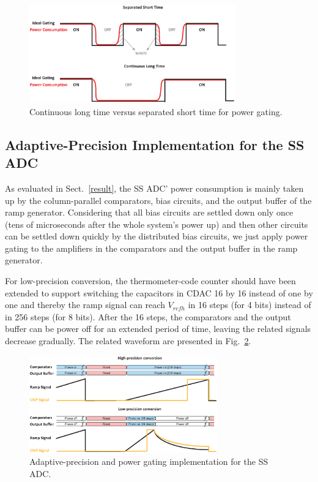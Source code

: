 \begin{figure}[htbp]
	\centerline{\includegraphics[width=3.5in]{./Figures/TIME.eps}}
	\caption{Continuous long time versus separated short time for power gating.}
	\label{TIME}
\end{figure}  

\subsection{Adaptive-Precision Implementation for the SS ADC}

As evaluated in Sect.~\ref{result}, the SS ADC’ power consumption is mainly taken up by the column-parallel comparators, bias circuits, and the output buffer of the ramp generator. 
Considering that all bias circuits are settled down only once (tens of microseconds after the whole system's power up) and then other circuits can be settled down quickly by the distributed 
bias circuits, we just apply power gating to the amplifiers in the comparators and the output buffer in the ramp generator.

For low-precision conversion, the thermometer-code counter should have been extended to support switching the capacitors in CDAC 16 by 16 instead of one by one and thereby the ramp signal can reach $V_{refh}$ in 16 steps (for 4 bits) instead of in 256 steps (for 8 bits). 
After the 16 steps, the comparators and the output buffer can be power off for an extended period of time, leaving the related signals decrease gradually.
The related waveform are presented in Fig.~\ref{SS_pg}. 

\begin{figure}[htbp]
	\centerline{\includegraphics[width=3.2in]{./Figures/SS_pg.eps}}
	\caption{Adaptive-precision and power gating implementation for the SS ADC.}
	\label{SS_pg}
\end{figure} 

